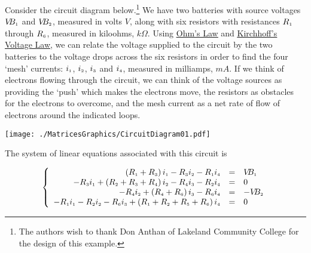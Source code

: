 \begin{ex} \label{circuitex} Consider the circuit diagram below.\footnote{The authors wish to thank Don Anthan of Lakeland Community College for the design of this example.}   We have two batteries with source voltages $V\!\!B_{\mbox{\tiny$1$}}$ and $V\!\!B_{\mbox{\tiny$2$}}$, measured in volts $V$, along with six resistors with resistances $R_{\mbox{\tiny$1$}}$ through $R_{\mbox{\tiny$6$}}$, measured in kiloohms, $k\Omega$.  Using \href{http://en.wikipedia.org/wiki/Ohm's_law}{\underline{Ohm's Law}}   and \href{http://en.wikipedia.org/wiki/Kirchhoff's_circuit_laws}{\underline{Kirchhoff's Voltage Law}}, we can relate the voltage supplied to the circuit by the two batteries to the voltage drops across the six resistors in order to find the four `mesh' currents: $i_{\mbox{\tiny$1$}}$, $i_{\mbox{\tiny$2$}}$, $i_{\mbox{\tiny$3$}}$ and $i_{\mbox{\tiny$4$}}$, measured in milliamps, $mA$.  If we think of electrons flowing through the circuit, we can think of the voltage sources as providing the `push' which makes the electrons move, the resistors as obstacles for the electrons to overcome, and the mesh current as a net rate of flow of electrons around the indicated loops.


\centerline{\texttt{[image: ./MatricesGraphics/CircuitDiagram01.pdf]}}

The system of linear equations associated with this circuit is

\[ \left\{ \begin{array}{rcl} \left(R_{\mbox{\tiny$1$}} + R_{\mbox{\tiny$3$}}\right)i_{\mbox{\tiny$1$}} - R_{\mbox{\tiny$3$}}i_{\mbox{\tiny$2$}} - R_{\mbox{\tiny$1$}}i_{\mbox{\tiny$4$}} & = & V\!\!B_{\mbox{\tiny$1$}} \\
-R_{\mbox{\tiny$3$}}i_{\mbox{\tiny$1$}} + \left(R_{\mbox{\tiny$2$}} + R_{\mbox{\tiny$3$}} + R_{\mbox{\tiny$4$}}\right)i_{\mbox{\tiny$2$}} - R_{\mbox{\tiny$4$}}i_{\mbox{\tiny$3$}} - R_{\mbox{\tiny$2$}}i_{\mbox{\tiny$4$}} & = & 0 \\
-R_{\mbox{\tiny$4$}}i_{\mbox{\tiny$2$}} + \left(R_{\mbox{\tiny$4$}} + R_{\mbox{\tiny$6$}}\right)i_{\mbox{\tiny$3$}} - R_{\mbox{\tiny$6$}}i_{\mbox{\tiny$4$}} & = & -V\!\!B_{\mbox{\tiny$2$}} \\
-R_{\mbox{\tiny$1$}}i_{\mbox{\tiny$1$}} - R_{\mbox{\tiny$2$}}i_{\mbox{\tiny$2$}} - R_{\mbox{\tiny$6$}}i_{\mbox{\tiny$3$}} + \left(R_{\mbox{\tiny$1$}} + R_{\mbox{\tiny$2$}} + R_{\mbox{\tiny$5$}} + R_{\mbox{\tiny$6$}}\right)i_{\mbox{\tiny$4$}} & = & 0 \\  \end{array} \right.\]


\end{ex}

